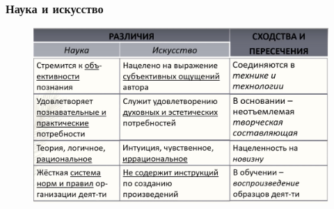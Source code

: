 \subsubsection{Наука и искусство}

\begin{figure}[H]
    \centering
    \includegraphics[width=0.8\linewidth]{pictures/sciart.png}
    \label{sciart}
\end{figure}

